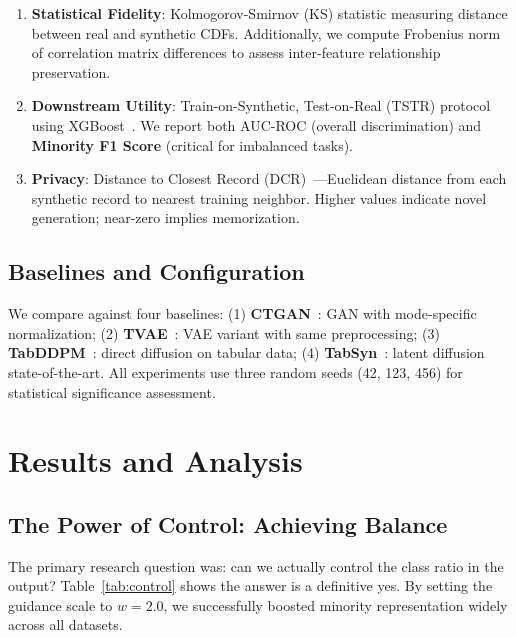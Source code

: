 \documentclass[conference]{IEEEtran}
\begin{document}
\begin{enumerate}
    \item \textbf{Statistical Fidelity}: Kolmogorov-Smirnov (KS) statistic measuring distance between real and synthetic CDFs. Additionally, we compute Frobenius norm of correlation matrix differences to assess inter-feature relationship preservation.
    \item \textbf{Downstream Utility}: Train-on-Synthetic, Test-on-Real (TSTR) protocol using XGBoost~\cite{chen2016xgboost}. We report both AUC-ROC (overall discrimination) and \textbf{Minority F1 Score} (critical for imbalanced tasks).
    \item \textbf{Privacy}: Distance to Closest Record (DCR)~\cite{stadler2022synthetic}---Euclidean distance from each synthetic record to nearest training neighbor. Higher values indicate novel generation; near-zero implies memorization.
\end{enumerate}

\subsection{Baselines and Configuration}
We compare against four baselines: (1) \textbf{CTGAN}~\cite{xu2019ctgan}: GAN with mode-specific normalization; (2) \textbf{TVAE}~\cite{xu2019ctgan}: VAE variant with same preprocessing; (3) \textbf{TabDDPM}~\cite{kotelnikov2023tabddpm}: direct diffusion on tabular data; (4) \textbf{TabSyn}~\cite{zhang2024tabsyn}: latent diffusion state-of-the-art. All experiments use three random seeds (42, 123, 456) for statistical significance assessment.

\section{Results and Analysis}

\subsection{The Power of Control: Achieving Balance}
The primary research question was: can we actually control the class ratio in the output? Table~\ref{tab:control} shows the answer is a definitive yes. By setting the guidance scale to $w=2.0$, we successfully boosted minority representation widely across all datasets.
\end{document}
